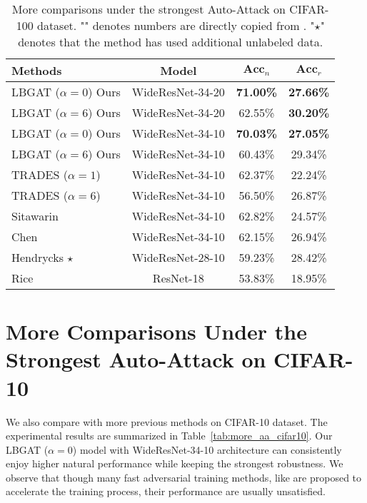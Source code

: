 \documentclass[10pt,twocolumn,letterpaper]{article}
\begin{document}
\vspace{0.2in}
\begin{table*}[h]
	\centering
	\caption{More comparisons under the strongest Auto-Attack on CIFAR-100 dataset. "\dag" denotes numbers are directly copied from \cite{croce2020reliable}. "$\star$" denotes that the method has used additional unlabeled data.} 
	\vspace{0.1cm}
	\begin{tabular}{l|c|c|c}
		\textbf{Methods} & Model &$\textbf{Acc}_{n}$ &$\textbf{Acc}_{r}$ \\
		\hline
		\hline
		LBGAT ($\alpha=0$) Ours                 &WideResNet-34-20 &\textbf{71.00\%} &\textbf{27.66\%} \\
		LBGAT ($\alpha=6$) Ours                 &WideResNet-34-20 &62.55\% &\textbf{30.20\%} \\
		LBGAT ($\alpha=0$) Ours                 &WideResNet-34-10 &\textbf{70.03\%} &\textbf{27.05\%} \\
		LBGAT ($\alpha=6$) Ours                 &WideResNet-34-10 &60.43\% &29.34\% \\
		\hline
		\hline
		
		TRADES ($\alpha=1$) \cite{zhang2019theoretically}      &WideResNet-34-10 &62.37\% &22.24\% \\
		TRADES ($\alpha=6$) \cite{zhang2019theoretically}      &WideResNet-34-10 &56.50\% &26.87\% \\
		Sitawarin \etal \cite{sitawarin2020improving} \dag &WideResNet-34-10 &62.82\%    &24.57\% \\
		Chen \etal \cite{chen2020efficient} \dag           &WideResNet-34-10 &62.15\%	&26.94\% \\ 
		Hendrycks \etal \cite{hendrycks2019using} \dag $\star$     &WideResNet-28-10 &59.23\%	&28.42\% \\
		Rice \etal \cite{rice2020overfitting} \dag         &ResNet-18        &53.83\%    &18.95\% \\
		\hline
		\hline
	\end{tabular}
	\label{tab:more_aa_cifar100}
\end{table*}

\newpage
\section{More Comparisons Under the Strongest Auto-Attack on CIFAR-10}
We also compare with more previous methods on CIFAR-10 dataset. The experimental results are summarized in Table~\ref{tab:more_aa_cifar10}. Our LBGAT ($\alpha=0$) model with WideResNet-34-10 architecture can consistently enjoy higher natural performance while keeping the strongest robustness. We observe that though many fast adversarial training methods, like \cite{wang2019bilateral,shafahi2019adversarial} are proposed to accelerate the training process, their performance are usually unsatisfied.
\end{document}
